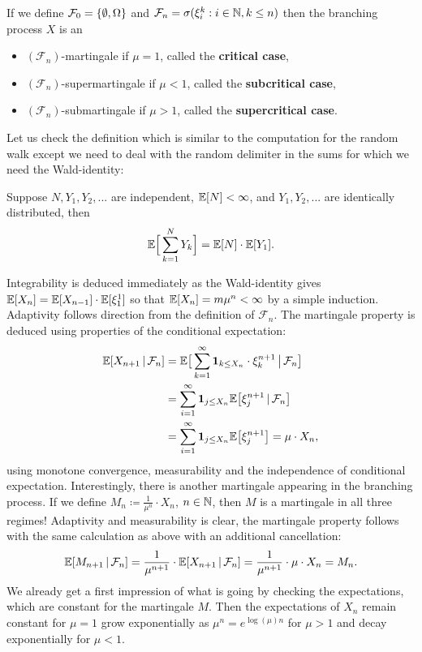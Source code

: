 \begin{example}
	 If we define $\mathcal{F}_0 = \lbrace \emptyset,\Omega \rbrace$ and $\mathcal{F}_n = \sigma(\xi_i^k: i\in \mathbb{N},k\leq n)$ then the branching process $X$ is an
			\begin{itemize}
				\item
					$(\mathcal F_n)$-martingale if $\mu=1$, called the \textbf{critical case},
				\item
					$(\mathcal F_n)$-supermartingale if $\mu<1$, called the \textbf{subcritical case},
				\item
					$(\mathcal F_n)$-submartingale if $\mu>1$, called the \textbf{supercritical case}.
			\end{itemize}
	Let us check the definition which is similar to the computation for the random walk except we need to deal with the random delimiter in the sums for which we need the Wald-identity:
	\begin{luebung}
		Suppose $N, Y_1,Y_2,...$ are independent, $\mathbb{E}[N]<\infty$, and $Y_1,Y_2,...$ are identically distributed, then
		\begin{align}\label{Wald}
			\mathbb{E}\Big[\sum_{k=1}^N Y_k\Big]=\mathbb{E}[N]\cdot \mathbb{E}[Y_1].
		\end{align}
	\end{luebung}
	Integrability is deduced immediately as the Wald-identity gives $\mathbb{E}[X_n]=\mathbb{E}[X_{n-1}]\cdot \mathbb{E}[\xi_1^1]$ so that $\mathbb{E}[X_n]=m\mu^{n}<\infty$ by a simple induction. Adaptivity follows direction from the definition of $\mathcal F_n$. The martingale property is deduced using properties of the conditional expectation:
			\begin{align*}
				\mathbb{E}[X_{n+1}\,|\,\mathcal{F}_n] &= \mathbb{E}\big[ \sum_{k=1}^{\infty}\mathbf 1_{k \leq X_n}\cdot \xi_k^{n+1}\,\big|\,\mathcal{F}_n\big] \\
										&=\sum_{i=1}^{\infty}\mathbf 1_{j \leq X_n} \mathbb{E}\big[\xi_j^{n+1}\,|\,\mathcal{F}_n\big] \\
										&=\sum_{i=1}^{\infty}\mathbf 1_{j \leq X_n} \mathbb{E}\big[\xi_j^{n+1}\big] 
										=\mu \cdot X_n,
			\end{align*}
			using monotone convergence, measurability and the independence of conditional expectation. Interestingly, there is another martingale appearing in the branching process. If we define $M_n \coloneqq \frac{1}{\mu^n}\cdot X_n$, $n\in\mathbb{N}$, then $M$ is a martingale in all three regimes! Adaptivity and measurability is clear, the martingale property follows with the same calculation as above with an additional cancellation:			
			$$ \mathbb{E}[M_{n+1}\,|\,\mathcal{F}_n] = \frac{1}{\mu^{n+1}}\cdot \mathbb{E}[X_{n+1}\,|\,\mathcal{F}_n] = \frac{1}{\mu^{n+1}} \cdot \mu \cdot X_n = M_n.$$
			We already get a first impression of what is going by checking the expectations, which are constant for the martingale $M$. Then the expectations of $X_n$ remain constant for $\mu=1$ grow exponentially as $\mu^n=e^{\log(\mu)n}$ for $\mu>1$ and decay exponentially for $\mu<1$.
		\end{example}

